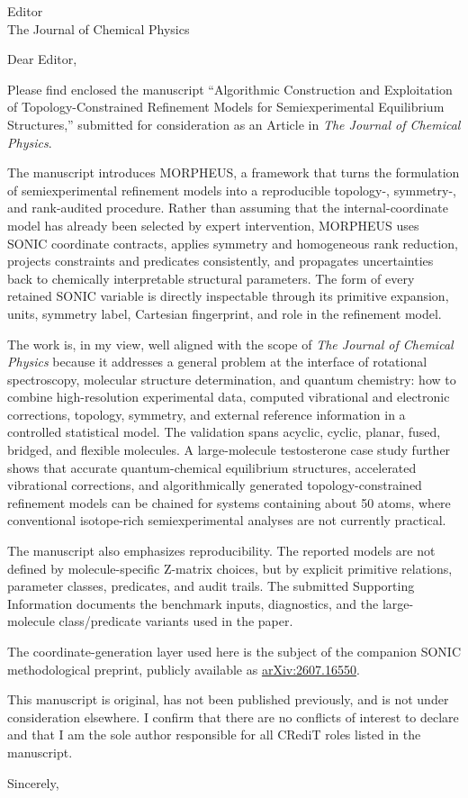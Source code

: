 \documentclass[10pt]{letter}
\begin{document}
\begin{letter}{Editor\\
The Journal of Chemical Physics}

\opening{Dear Editor,}

Please find enclosed the manuscript ``Algorithmic Construction and Exploitation
of Topology-Constrained Refinement Models for Semiexperimental Equilibrium
Structures,'' submitted for consideration as an Article in \emph{The Journal of
Chemical Physics}.

The manuscript introduces MORPHEUS, a framework that turns the formulation of
semiexperimental refinement models into a reproducible topology-, symmetry-,
and rank-audited procedure. Rather than assuming that the internal-coordinate
model has already been selected by expert intervention, MORPHEUS uses
SONIC coordinate contracts, applies symmetry and homogeneous
rank reduction, projects constraints and predicates consistently, and
propagates uncertainties back to chemically interpretable structural
parameters. The form of every retained SONIC variable is directly inspectable
through its primitive expansion, units, symmetry label, Cartesian fingerprint,
and role in the refinement model.

The work is, in my view, well aligned with the scope of \emph{The Journal of
Chemical Physics} because it addresses a general problem at the interface of
rotational spectroscopy, molecular structure determination, and quantum
chemistry: how to combine high-resolution experimental data, computed
vibrational and electronic corrections, topology, symmetry, and external
reference information in a controlled statistical model. The validation spans
acyclic, cyclic, planar, fused, bridged, and flexible molecules. A
large-molecule testosterone case study further shows that accurate
quantum-chemical equilibrium structures, accelerated vibrational corrections, and
algorithmically generated topology-constrained refinement models can be chained
for systems containing about 50 atoms, where conventional isotope-rich
semiexperimental analyses are not currently practical.

The manuscript also emphasizes reproducibility. The reported models are not
defined by molecule-specific Z-matrix choices, but by explicit primitive
relations, parameter classes, predicates, and audit trails. The submitted
Supporting Information documents the benchmark inputs, diagnostics, and the
large-molecule class/predicate variants used in the paper.

The coordinate-generation layer used here is the subject of the companion
SONIC methodological preprint, publicly available as
\href{https://arxiv.org/abs/2607.16550}{arXiv:2607.16550}.

This manuscript is original, has not been published previously, and is not
under consideration elsewhere. I confirm that there are no conflicts of
interest to declare and that I am the sole author responsible for all CRediT
roles listed in the manuscript.

\closing{Sincerely,}

\end{letter}
\end{document}
